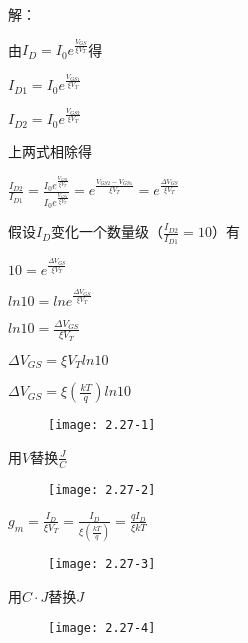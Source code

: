






解：

由$I_D=I_0e^{\frac{V_{GS}}{\xi V_T}}$得

$I_{D1}=I_0e^{\frac{V_{GS1}}{\xi V_T}}$

$I_{D2}=I_0e^{\frac{V_{GS2}}{\xi V_T}}$

上两式相除得

$\frac{I_{D2}}{I_{D1}}=\frac{I_0e^{\frac{V_{GS2}}{\xi V_T}}}{I_0e^{\frac{V_{GS1}}{\xi V_T}}}=e^{\frac{V_{GS2}-V_{GS1}}{\xi V_T}}=e^{\frac{\Delta V_{GS}}{\xi V_T}}$

假设$I_D$变化一个数量级（$\frac{I_{D2}}{I_{D1}}=10$）有

$10=e^{\frac{\Delta V_{GS}}{\xi V_T}}$

$ln10=lne^{\frac{\Delta V_{GS}}{\xi V_T}}$

$ln10=\frac{\Delta V_{GS}}{\xi V_T}$

$\Delta V_{GS}=\xi V_Tln10$

$\Delta V_{GS}=\xi (\frac{kT}{q})ln10$

\begin{figure}[H] %
	\begin{minipage}{\linewidth}
		\texttt{[image: 2.27-1]}
	\end{minipage}
\end{figure}

用$V$替换$\frac{J}{C}$





\begin{figure}[H] %
	\begin{minipage}{\linewidth}
		\texttt{[image: 2.27-2]}
	\end{minipage}
\end{figure}









$g_m=\frac{I_D}{\xi V_T}=\frac{I_D}{\xi (\frac{kT}{q})}=\frac{qI_D}{\xi kT}$


\begin{figure}[H] %
	\begin{minipage}{\linewidth}
		\texttt{[image: 2.27-3]}
	\end{minipage}
\end{figure}



用$C\cdot J$替换$J$

\begin{figure}[H] %
	\begin{minipage}{\linewidth}
		\texttt{[image: 2.27-4]}
	\end{minipage}
\end{figure}















